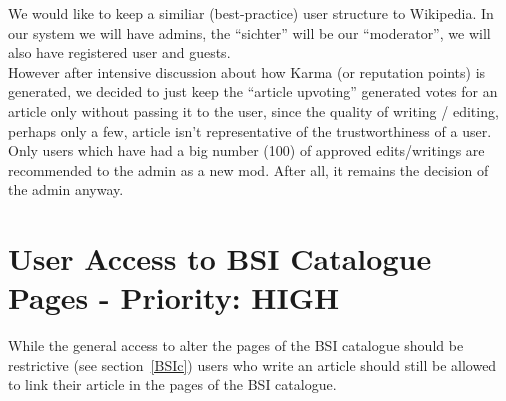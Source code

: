 \begin{tcolorbox}[breakable,colback=red!14,colframe=red!40!black,title=UPDATE 30/11/2017]
We would like to keep a similiar (best-practice) user structure to Wikipedia. In our system we will have admins, the “sichter” will be our “moderator”, we will also have registered user and guests. \\
However after intensive discussion about how Karma (or reputation points) is generated, we decided to just keep the “article upvoting” generated votes for an article only without passing it to the user, since the quality of writing / editing, perhaps only a few, article isn’t representative of the trustworthiness of a user.\\
Only users which have had a big number (100) of approved edits/writings are recommended to the admin as a new mod. After all, it remains the decision of the admin anyway.
\end{tcolorbox}


\section{User Access to BSI Catalogue Pages - Priority: HIGH}
\label{2nd_bsi_link}
While the general access to alter the pages of the BSI catalogue should be restrictive (see section~\ref{BSIc}) users who write an article should still be allowed to link their article in the pages of the BSI catalogue.

